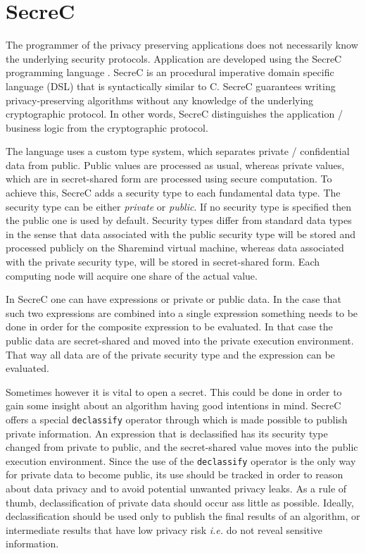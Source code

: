 \section{SecreC}\label{s:secrec}

The programmer of the privacy preserving applications does not necessarily know the underlying security protocols.
Application are developed using the SecreC programming language \cite{jagomagis2010secrec}.
SecreC is an procedural imperative domain specific language (DSL) that is syntactically similar to C. SecreC guarantees writing privacy-preserving algorithms without any knowledge of the underlying cryptographic protocol.
In other words, SecreC distinguishes the application / business logic from the cryptographic protocol.

The language uses a custom type system, which separates private / confidential data from public.
Public values are processed as usual, whereas private values, which are in secret-shared form are processed using secure computation.
To achieve this, SecreC adds a security type to each fundamental data type.
The security type can be either \textit{private} or \textit{public}.
If no security type is specified then the public one is used by default.
Security types differ from standard data types in the sense that data associated with the public security type will be stored and processed publicly on the Sharemind virtual machine, whereas data associated with the private security type, will be stored in secret\hyp shared form.
Each computing node will acquire one share of the actual value.

In SecreC one can have expressions or private or public data.
In the case that such two expressions are combined into a single expression something needs to be done in order for the composite expression to be evaluated.
In that case the public data are secret\hyp shared and moved into the private execution environment.
That way all data are of the private security type and the expression can be evaluated.

Sometimes however it is vital to open a secret.
This could be done in order to gain some insight about an algorithm having good intentions in mind.
SecreC offers a special \texttt{declassify} operator through which is made possible to publish private information.
An expression that is  declassified has its security type changed from private to public, and the secret\hyp shared value moves into the public execution environment.
Since the use of the \texttt{declassify} operator is the only way for private data to become public, its use should be tracked in order to reason about data privacy and to avoid potential unwanted privacy leaks.
As a rule of thumb, declassification of private data should occur ass little as possible.
Ideally, declassification should be used only to publish the final results of an algorithm, or intermediate results that have low privacy risk \textit{i.e.} do not reveal sensitive information.

